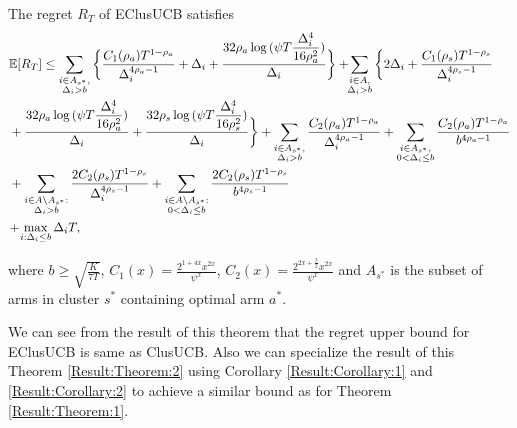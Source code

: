 \begin{theorem}
\label{Result:Theorem:2}
The regret $R_T$ of EClusUCB satisfies
\begin{align*}
&\mathbb{E} [R_{T}]\leq 
\sum\limits_{\substack{i\in A_{s^{*}},\\\Delta_{i} > b}}\bigg\lbrace \dfrac{C_1(\rho_{a})T^{1-\rho_{a}}}{\Delta_{i}^{4\rho_{a}-1}} + \Delta_{i}
 + \frac{32\rho_{a}\log{(\psi T\dfrac{\Delta_{i}^{4}}{16\rho_{a}^{2}})}}{\Delta_{i}} \bigg\rbrace
 + \! \! \sum\limits_{\substack{i\in A,\\\Delta_{i} > b}} \bigg\lbrace 2\Delta_{i}+
\dfrac{C_1(\rho_{s})T^{1-\rho_{s}}}{\Delta_{i}^{4\rho_{s}-1}} \\
&+ \frac{32\rho_{a}\log{(\psi T\dfrac{\Delta_{i}^{4}}{16\rho_{a}^{2}})}}{\Delta_{i}} 
+ \dfrac{32\rho_{s}\log{(\psi T\dfrac{\Delta_{i}^{4}}{16\rho_{s}^{2}})}}{\Delta_{i}}\bigg\rbrace
+ \sum\limits_{\substack{i\in A_{s^{*}},\\ \Delta_{i} > b}} 
\frac{C_2(\rho_{a})T^{1-\rho_{a}}}{\Delta_{i}^{4\rho_{a}-1}}
+\sum\limits_{\substack{i\in A_{s^{*}},\\0 < \Delta_{i}\leq b}}\frac{C_2(\rho_a)T^{1-\rho_{a}}}{b^{4\rho_{a} -1}}\\ 
&+ \sum_{\substack{i\in A\setminus A_{s^*}:\\\Delta_{i}> b}}\dfrac{2C_{2}(\rho_{s})T^{1-\rho_{s}}}{\Delta_{i}^{4\rho_{s}-1}} +\sum_{\substack{i\in A \setminus A_{s^*}:\\ 0 < \Delta_{i} \leq b}}\dfrac{2C_{2}(\rho_{s})T^{1-\rho_{s}}}{b^{4\rho_{s}-1}}\\
& \!+\! \max\limits_{i:\Delta_{i}\leq b}\Delta_{i}T, 
\end{align*}

where $b\geq \sqrt{\frac{K}{7 T}}$, $C_1(x) = \frac{2^{1+4x}x^{2x}}{\psi^{x}}$, $C_2(x) = \frac{2^{2x+\frac{3}{2}}x^{2x}}{\psi^{x}}$ and $A_{s^{*}}$ is the subset of arms in cluster $s^{*}$ containing optimal arm $a^{*}$.
\end{theorem}

We can see from the result of this theorem that the regret upper bound for EClusUCB is same as ClusUCB. Also we can specialize the result of this Theorem \ref{Result:Theorem:2} using Corollary \ref{Result:Corollary:1} and \ref{Result:Corollary:2} to achieve a similar bound as for Theorem \ref{Result:Theorem:1}.

